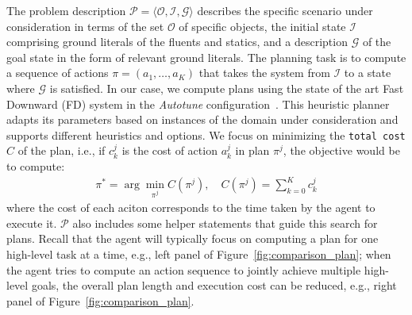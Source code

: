 The problem description $\mathcal{P} = \langle\mathcal{O}, \mathcal{I}, \mathcal{G} \rangle$ describes the specific scenario under consideration in terms of the set $\mathcal{O}$ of specific objects, the initial state $\mathcal{I}$ comprising ground literals of the fluents and statics, and a description $\mathcal{G}$ of the goal state in the form of relevant ground literals. The planning task is to compute a sequence of actions $\pi = (a_1, \ldots, a_K)$ that takes the system from $\mathcal{I}$ to a state where $\mathcal{G}$ is satisfied. In our case, we compute plans using the state of the art Fast Downward (FD) system in the \textit{Autotune} configuration~\cite{Helmert_2006}. This heuristic planner adapts its parameters based on instances of the domain under consideration and supports different heuristics and options. We focus on minimizing the \texttt{total cost} $C$ of the plan, i.e., if $c_k^j$ is the cost of action $a_k^j$ in plan $\pi^j$, the objective would be to compute:
\vspace{-0.7em}
\begin{align*}
    \pi^* = \arg \min_{\pi^j} C(\pi^j), \quad C(\pi^j) = \sum_{k=0}^K c_{k}^j
\end{align*}
where the cost of each aciton corresponds to the time taken by the agent to execute it. $\mathcal{P}$ also includes some helper statements that guide this search for plans. Recall that the agent will typically focus on computing a plan for one high-level task at a time, e.g., left panel of Figure~\ref{fig:comparison_plan}; when the agent tries to compute an action sequence to jointly achieve multiple high-level goals, the overall plan length and execution cost can be reduced, e.g., right panel of Figure~\ref{fig:comparison_plan}.



